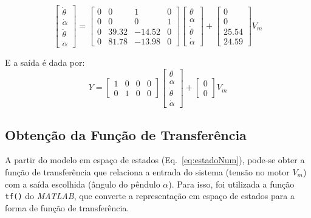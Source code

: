 \documentclass[9pt,a4paper,twocolumn,twoside]{tau-class/tau}
\begin{document}
\begin{equation}
\begin{bmatrix}
\dot{\theta} \\
\dot{\alpha} \\
\ddot{\theta} \\
\ddot{\alpha}
\end{bmatrix}
=
\begin{bmatrix}
0 & 0 & 1 & 0 \\
0 & 0 & 0 & 1 \\
0 & 39.32 & -14.52 & 0 \\
0 & 81.78 & -13.98 & 0
\end{bmatrix}
\begin{bmatrix}
\theta \\ \alpha \\ \dot{\theta} \\ \dot{\alpha}
\end{bmatrix}
+
\begin{bmatrix}
0 \\ 0 \\ 25.54 \\ 24.59
\end{bmatrix} V_m
\label{eq:estadoNum}
\end{equation}

E a saída é dada por:
\begin{equation}
Y =
\begin{bmatrix}
1 & 0 & 0 & 0 \\
0 & 1 & 0 & 0
\end{bmatrix}
\begin{bmatrix}
\theta \\ \alpha \\ \dot{\theta} \\ \dot{\alpha}
\end{bmatrix}
+
\begin{bmatrix}
0 \\ 0
\end{bmatrix} V_m
\end{equation}

\subsection{Obtenção da Função de Transferência}

A partir do modelo em espaço de estados (Eq.~\ref{eq:estadoNum}), pode-se obter a 
função de transferência que relaciona a entrada do sistema (tensão no motor $V_m$) 
com a saída escolhida (ângulo do pêndulo $\alpha$). Para isso, foi utilizada a 
função \texttt{tf()} do \textit{MATLAB}, que converte a representação em espaço 
de estados para a forma de função de transferência.
\end{document}
